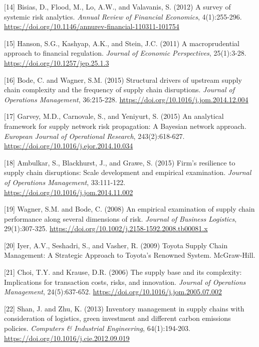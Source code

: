 \documentclass[a4 paper, 11pt,twoside]{article}
\newcommand{\0}{\Bf{0}}
\theoremstyle{definition}
\begin{document}
\label{ref14}[14] Bisias, D., Flood, M., Lo, A.W., and Valavanis, S. (2012) A survey of systemic risk analytics. \emph{Annual Review of Financial Economics}, 4(1):255-296. \href{https://doi.org/10.1146/annurev-financial-110311-101754}{https://doi.org/10.1146/annurev-financial-110311-101754}

\label{ref15}[15] Hanson, S.G., Kashyap, A.K., and Stein, J.C. (2011) A macroprudential approach to financial regulation. \emph{Journal of Economic Perspectives}, 25(1):3-28. \href{https://doi.org/10.1257/jep.25.1.3}{https://doi.org/10.1257/jep.25.1.3}

\label{ref16}[16] Bode, C. and Wagner, S.M. (2015) Structural drivers of upstream supply chain complexity and the frequency of supply chain disruptions. \emph{Journal of Operations Management}, 36:215-228. \href{https://doi.org/10.1016/j.jom.2014.12.004}{https://doi.org/10.1016/j.jom.2014.12.004}

\label{ref17}[17] Garvey, M.D., Carnovale, S., and Yeniyurt, S. (2015) An analytical framework for supply network risk propagation: A Bayesian network approach. \emph{European Journal of Operational Research}, 243(2):618-627. \href{https://doi.org/10.1016/j.ejor.2014.10.034}{https://doi.org/10.1016/j.ejor.2014.10.034}

\label{ref18}[18] Ambulkar, S., Blackhurst, J., and Grawe, S. (2015) Firm's resilience to supply chain disruptions: Scale development and empirical examination. \emph{Journal of Operations Management}, 33:111-122. \href{https://doi.org/10.1016/j.jom.2014.11.002}{https://doi.org/10.1016/j.jom.2014.11.002}

\label{ref19}[19] Wagner, S.M. and Bode, C. (2008) An empirical examination of supply chain performance along several dimensions of risk. \emph{Journal of Business Logistics}, 29(1):307-325. \href{https://doi.org/10.1002/j.2158-1592.2008.tb00081.x}{https://doi.org/10.1002/j.2158-1592.2008.tb00081.x}

\label{ref20}[20] Iyer, A.V., Seshadri, S., and Vasher, R. (2009) Toyota Supply Chain Management: A Strategic Approach to Toyota's Renowned System. McGraw-Hill.

\label{ref21}[21] Choi, T.Y. and Krause, D.R. (2006) The supply base and its complexity: Implications for transaction costs, risks, and innovation. \emph{Journal of Operations Management}, 24(5):637-652. \href{https://doi.org/10.1016/j.jom.2005.07.002}{https://doi.org/10.1016/j.jom.2005.07.002}

\label{ref22}[22] Shan, J. and Zhu, K. (2013) Inventory management in supply chains with consideration of logistics, green investment and different carbon emissions policies. \emph{Computers \& Industrial Engineering}, 64(1):194-203. \href{https://doi.org/10.1016/j.cie.2012.09.019}{https://doi.org/10.1016/j.cie.2012.09.019}
\end{document}
